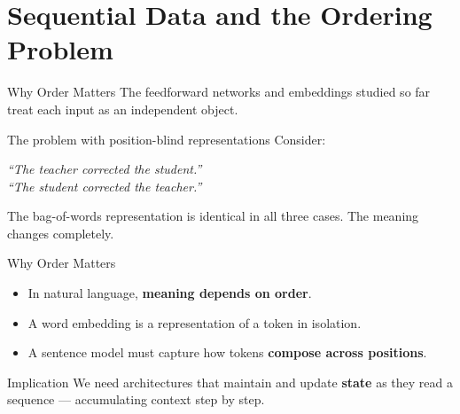 \documentclass[aspectratio=169]{beamer}
\begin{document}
\section{Sequential Data and the Ordering Problem}
%
\begin{frame}{Why Order Matters}
The feedforward networks and embeddings studied so far treat each input as an independent object.

\vspace{0.2cm}
\begin{block}{The problem with position-blind representations}
Consider:
\begin{center}
\emph{``The teacher corrected the student.''}\\[4pt]
\emph{``The student corrected the teacher.''}
\end{center}
The bag-of-words representation is identical in all three cases.
The meaning changes completely.
\end{block}
\end{frame}
%
%
\begin{frame}{Why Order Matters}
\vspace{0.15cm}
\begin{itemize}
    \item In natural language, \textbf{meaning depends on order}.
    \item A word embedding is a representation of a token in isolation.
    \item A sentence model must capture how tokens \textbf{compose across positions}.
\end{itemize}

\begin{alertblock}{Implication}
We need architectures that maintain and update \textbf{state} as they read a sequence ---
accumulating context step by step.
\end{alertblock}
\end{frame}
%
%
\end{document}
